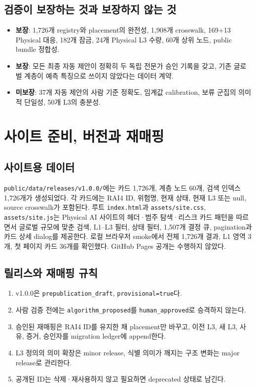\documentclass[11pt,a4paper]{article}
\newcommand{\code}[1]{\texttt{#1}}
\begin{document}
\subsection{검증이 보장하는 것과 보장하지 않는 것}

\begin{itemize}
  \item \textbf{보장}: 1,726개 registry와 placement의 완전성, 1,908개 crosswalk, 169+13 Physical 대응, 182개 잠금, 24개 Physical L3 수량, 60개 상위 노드, public bundle 정합성.
  \item \textbf{보장}: 모든 최종 자동 제안이 정확히 두 독립 전문가 승인 기록을 갖고, 기존 글로벌 계층이 예측 특징으로 쓰이지 않았다는 데이터 계약.
  \item \textbf{미보장}: 37개 자동 제안의 사람 기준 정확도, 임계값 calibration, 보류 군집의 의미적 단일성, 50개 L3의 충분성.
\end{itemize}

\section{사이트 준비, 버전과 재매핑}

\subsection{사이트용 데이터}

\code{public/data/releases/v1.0.0/}에는 카드 1,726개, 계층 노드 60개, 검색 인덱스 1,726개가 생성되었다. 각 카드에는 RAI4 ID, 위험명, 현재 상태, 현재 L3 또는 null, source crosswalk가 포함된다. 루트 \code{index.html}과 \code{assets/site.css}, \code{assets/site.js}는 Physical AI 사이트의 헤더·범주 탐색·리스크 카드 패턴을 따르면서 글로벌 규모에 맞춘 검색, L1--L3 필터, 상태 필터, 1,507개 결정 큐, pagination과 카드 상세 dialog를 제공한다. 로컬 브라우저 smoke에서 전체 1,726개 결과, L1 영역 3개, 첫 페이지 카드 36개를 확인했다. GitHub Pages 공개는 수행하지 않았다.

\subsection{릴리스와 재매핑 규칙}

\begin{enumerate}
  \item v1.0.0은 \code{prepublication\_draft}, \code{provisional=true}다.
  \item 사람 검증 전에는 \code{algorithm\_proposed}를 \code{human\_approved}로 승격하지 않는다.
  \item 승인된 재매핑은 RAI4 ID를 유지한 채 placement만 바꾸고, 이전 L3, 새 L3, 사유, 증거, 승인자를 migration ledger에 append한다.
  \item L3 정의의 의미 확장은 minor release, 식별 의미가 깨지는 구조 변화는 major release로 관리한다.
  \item 공개된 ID는 삭제·재사용하지 않고 필요하면 deprecated 상태로 남긴다.
\end{enumerate}
\end{document}
